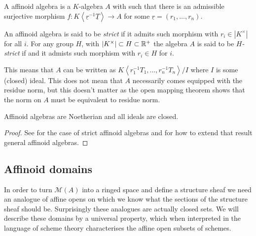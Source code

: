 \begin{definition}
	A affinoid algebra is a $K$-algebra $A$ with such that there is an admissible surjective morphism $f: K\left<\underline r ^{-1} \underline T \right> \to A$ for some $\underline r = (r_1, \ldots, r_n)$. 

	An affinoid algebra is said to be \emph{strict} if it admits such morphism with $r_i  \in |K^{\times }|$ for all $i$. 
	For any group $H$, with $|K^{\times }| \subset  H \subset \mathbb{R}^{ +}$ the algebra $A$ is said to be \emph{$H$-strict} if and it admists such morphism with $r_i \in H$ for $i$. 
\end{definition}
This means that $A$ can be written as $K\left<r_1^{-1}T_1, \ldots, r_n^{-1}T_n \right> / I$ where $I$ is some (closed) ideal.
This does not mean that $A$ necessarily comes equipped with the residue norm, but this doesn't matter as the open mapping theorem shows that the norm on $A$ must be equivalent to residue norm.


\begin{proposition}
	Affinoid algebras are Noetherian and all ideals are closed. 
\end{proposition}
\begin{proof}
	See \cite[][chap.\ 6 prop.\ 3]{siegfriedboschNonArchimedeanAnalysisSystematic1984} for the case of strict affinoid algebras and \cite[][prop.\ 2.1.3]{berkovichSpectralTheoryAnalytic2012} for how to extend that result general affinoid algebras. 
\end{proof}

\subsection{Affinoid domains} \label{sec:affinoid_domains}

In order to turn $\mathcal{M} (A)$ into a ringed space and define a structure sheaf we need an analogue of affine opens on which we know what the sections of the structure sheaf should be. 
Surprisingly these analogues are actually closed sets.  
We will describe these domains by a universal property, which when interpreted in the language of scheme theory characterises the affine open subsets of schemes. 

